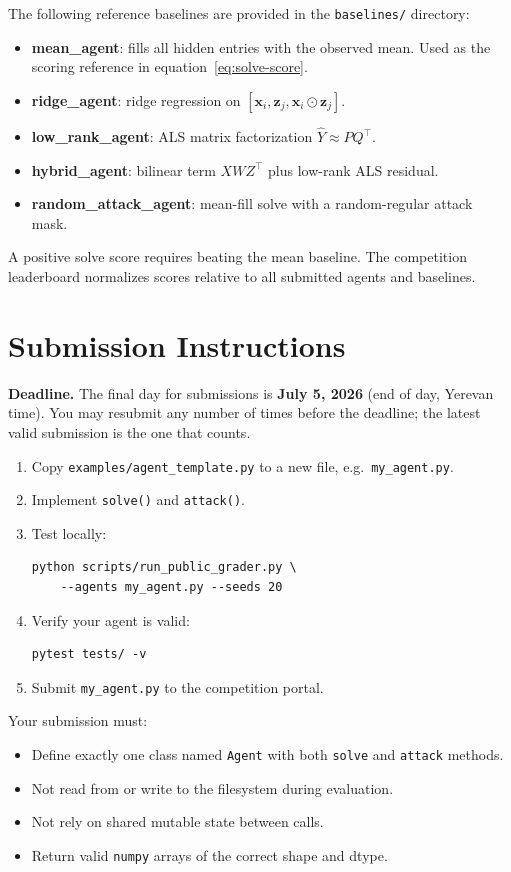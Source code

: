 \documentclass[11pt,a4paper]{article}
\begin{document}
The following reference baselines are provided in the \texttt{baselines/} directory:

\begin{itemize}
  \item \textbf{mean\_agent}: fills all hidden entries with the observed mean.
        Used as the scoring reference in equation~\eqref{eq:solve-score}.
  \item \textbf{ridge\_agent}: ridge regression on $[\mathbf{x}_i, \mathbf{z}_j, \mathbf{x}_i \odot \mathbf{z}_j]$.
  \item \textbf{low\_rank\_agent}: ALS matrix factorization $\hat{Y} \approx P Q^\top$.
  \item \textbf{hybrid\_agent}: bilinear term $X W Z^\top$ plus low-rank ALS residual.
  \item \textbf{random\_attack\_agent}: mean-fill solve with a random-regular attack mask.
\end{itemize}

A positive solve score requires beating the mean baseline.
The competition leaderboard normalizes scores relative to all submitted agents and baselines.

\section{Submission Instructions}

\noindent\textbf{Deadline.} The final day for submissions is
\textbf{July 5, 2026} (end of day, Yerevan time). You may resubmit any number of
times before the deadline; the latest valid submission is the one that counts.

\begin{enumerate}
  \item Copy \texttt{examples/agent\_template.py} to a new file, e.g.\ \texttt{my\_agent.py}.
  \item Implement \texttt{solve()} and \texttt{attack()}.
  \item Test locally:
    \begin{lstlisting}
python scripts/run_public_grader.py \
    --agents my_agent.py --seeds 20
    \end{lstlisting}
  \item Verify your agent is valid:
    \begin{lstlisting}
pytest tests/ -v
    \end{lstlisting}
  \item Submit \texttt{my\_agent.py} to the competition portal.
\end{enumerate}

Your submission must:
\begin{itemize}
  \item Define exactly one class named \texttt{Agent} with both \texttt{solve} and \texttt{attack} methods.
  \item Not read from or write to the filesystem during evaluation.
  \item Not rely on shared mutable state between calls.
  \item Return valid \texttt{numpy} arrays of the correct shape and dtype.
\end{itemize}
\end{document}
